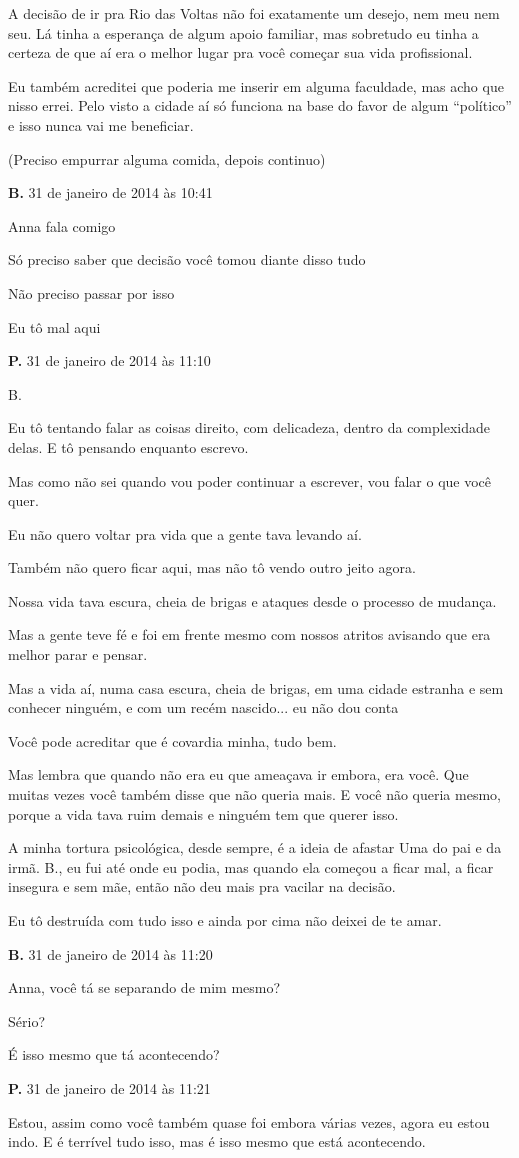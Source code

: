 {A decisão de ir pra Rio das Voltas não foi exatamente um desejo, nem meu
nem seu. Lá tinha a esperança de algum apoio familiar, mas sobretudo eu
tinha a certeza de que aí era o melhor lugar pra você começar sua vida
profissional.

Eu também acreditei que poderia me inserir em alguma faculdade, mas acho
que nisso errei. Pelo visto a cidade aí só funciona na base do favor de
algum ``político'' e isso nunca vai me beneficiar.

(Preciso empurrar alguma comida, depois continuo)

\textbf{B.} 31 de janeiro de 2014 às 10:41

Anna fala comigo

Só preciso saber que decisão você tomou diante disso tudo

Não preciso passar por isso

Eu tô mal aqui

\textbf{P.} 31 de janeiro de 2014 às 11:10

B.

Eu tô tentando falar as coisas direito, com delicadeza, dentro da
complexidade delas. E tô pensando enquanto escrevo.

Mas como não sei quando vou poder continuar a escrever, vou falar o que
você quer.

Eu não quero voltar pra vida que a gente tava levando aí.

Também não quero ficar aqui, mas não tô vendo outro jeito agora.

Nossa vida tava escura, cheia de brigas e ataques desde o processo de
mudança.

Mas a gente teve fé e foi em frente mesmo com nossos atritos avisando
que era melhor parar e pensar.

Mas a vida aí, numa casa escura, cheia de brigas, em uma cidade estranha
e sem conhecer ninguém, e com um recém nascido... eu não dou conta

Você pode acreditar que é covardia minha, tudo bem.

Mas lembra que quando não era eu que ameaçava ir embora, era você. Que
muitas vezes você também disse que não queria mais. E você não queria
mesmo, porque a vida tava ruim demais e ninguém tem que querer isso.

A minha tortura psicológica, desde sempre, é a ideia de afastar Uma do
pai e da irmã. B., eu fui até onde eu podia, mas quando ela começou a
ficar mal, a ficar insegura e sem mãe, então não deu mais pra vacilar na
decisão.

Eu tô destruída com tudo isso e ainda por cima não deixei de te amar.

\textbf{B.} 31 de janeiro de 2014 às 11:20

Anna, você tá se separando de mim mesmo?

Sério?

É isso mesmo que tá acontecendo?

\textbf{P.} 31 de janeiro de 2014 às 11:21

Estou, assim como você também quase foi embora várias vezes, agora eu
estou indo. E é terrível tudo isso, mas é isso mesmo que está
acontecendo.
}

